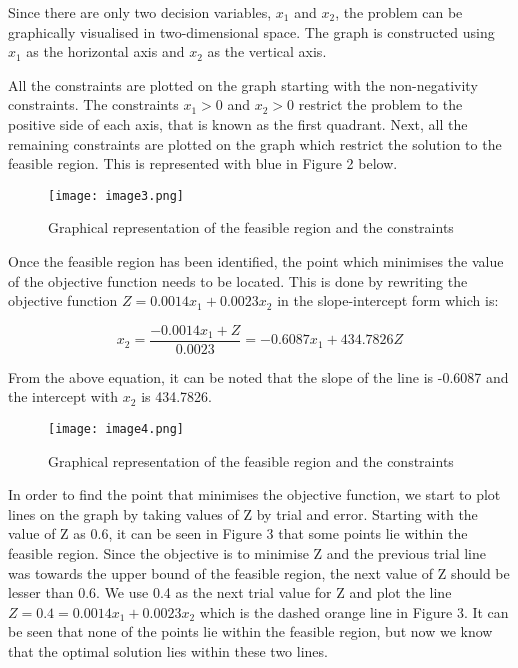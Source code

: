 \documentclass[
]{article}
\begin{document}
Since there are only two decision variables, \(x_1\) and \(x_2\), the problem can be graphically
visualised in two-dimensional space. The graph is constructed using \(x_1\) as the horizontal axis
and \(x_2\) as the vertical axis. 

All the constraints are plotted on the graph starting with the non-negativity constraints.
The constraints \(x_1 > 0\) and \(x_2 > 0\) restrict the problem to the positive side of each axis, that is known as the
first quadrant. Next, all the remaining constraints are plotted on the graph which restrict the solution to the feasible region.
This is represented with blue in Figure 2 below. 

\begin{figure}[h]
	\centering
	\texttt{[image: image3.png]}
	\caption{Graphical representation of the feasible region and the constraints}
\end{figure}

Once the feasible region has been identified, the point which minimises the value of the objective function needs to be located.
This is done by rewriting the objective function \(Z = 0.0014x_1 + 0.0023x_2\) in the slope-intercept form which is:

\[ x_2 = \frac{-0.0014x_1 + Z}{0.0023} = -0.6087x_1 + 434.7826Z \]

From the above equation, it can be noted that the slope of the line is -0.6087 and the intercept with \(x_2\) is 434.7826.

\begin{figure}[h]
	\centering
	\texttt{[image: image4.png]}
	\caption{Graphical representation of the feasible region and the constraints}
\end{figure}

In order to find the point that minimises the objective function, we start to plot lines on the graph by taking values of Z by trial and error.
Starting with the value of Z as 0.6, it can be seen in Figure 3 that some points lie within the feasible region.
Since the objective is to minimise Z and the previous trial line was towards the upper bound of the feasible region, the next value of Z should be lesser than 0.6.
We use 0.4 as the next trial value for Z and plot the line \(Z = 0.4 = 0.0014x_1 + 0.0023x_2\) which is the dashed orange line in Figure 3.
It can be seen that none of the points lie within the feasible region, but now we know that the optimal solution lies within these two lines.
\end{document}
